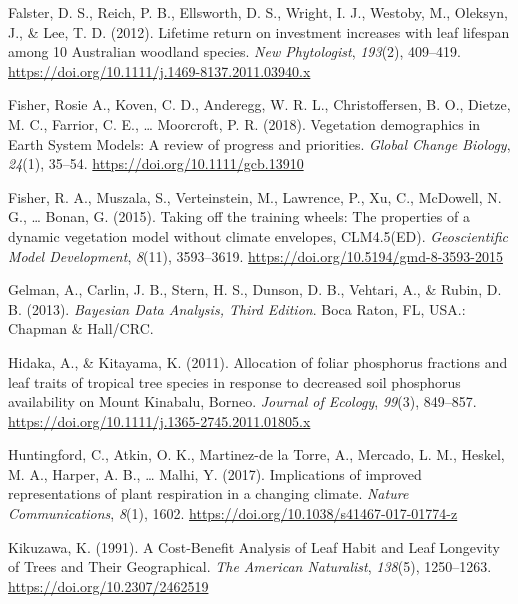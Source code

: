\documentclass[
  12pt,
  letterpaper,
  DIV=11,
  numbers=noendperiod]{scrartcl}
\newlength{\cslhangindent}
\newlength{\cslentryspacingunit} %
\newenvironment{CSLReferences}[2] %
 {%
  \setlength{\parindent}{0pt}
  \ifodd #1
  \let\oldpar\par
  \def\par{\hangindent=\cslhangindent\oldpar}
  \fi
  \setlength{\parskip}{#2\cslentryspacingunit}
 }%
 {}
\begin{document}
\begin{CSLReferences}{1}{0}
\leavevmode{}%
Falster, D. S., Reich, P. B., Ellsworth, D. S., Wright, I. J., Westoby,
M., Oleksyn, J., \& Lee, T. D. (2012). Lifetime return on investment
increases with leaf lifespan among 10 {Australian} woodland species.
\emph{New Phytologist}, \emph{193}(2), 409--419.
\url{https://doi.org/10.1111/j.1469-8137.2011.03940.x}

\leavevmode{}%
Fisher, Rosie A., Koven, C. D., Anderegg, W. R. L., Christoffersen, B.
O., Dietze, M. C., Farrior, C. E., \ldots{} Moorcroft, P. R. (2018).
Vegetation demographics in {Earth System Models}: {A} review of progress
and priorities. \emph{Global Change Biology}, \emph{24}(1), 35--54.
\url{https://doi.org/10.1111/gcb.13910}

\leavevmode{}%
Fisher, R. A., Muszala, S., Verteinstein, M., Lawrence, P., Xu, C.,
McDowell, N. G., \ldots{} Bonan, G. (2015). Taking off the training
wheels: The properties of a dynamic vegetation model without climate
envelopes, {CLM4}.5({ED}). \emph{Geoscientific Model Development},
\emph{8}(11), 3593--3619. \url{https://doi.org/10.5194/gmd-8-3593-2015}

\leavevmode{}%
Gelman, A., Carlin, J. B., Stern, H. S., Dunson, D. B., Vehtari, A., \&
Rubin, D. B. (2013). \emph{Bayesian {Data Analysis}, {Third Edition}}.
{Boca Raton, FL, USA.}: {Chapman \& Hall/CRC}.

\leavevmode{}%
Hidaka, A., \& Kitayama, K. (2011). Allocation of foliar phosphorus
fractions and leaf traits of tropical tree species in response to
decreased soil phosphorus availability on {Mount Kinabalu}, {Borneo}.
\emph{Journal of Ecology}, \emph{99}(3), 849--857.
\url{https://doi.org/10.1111/j.1365-2745.2011.01805.x}

\leavevmode{}%
Huntingford, C., Atkin, O. K., Martinez-de la Torre, A., Mercado, L. M.,
Heskel, M. A., Harper, A. B., \ldots{} Malhi, Y. (2017). Implications of
improved representations of plant respiration in a changing climate.
\emph{Nature Communications}, \emph{8}(1), 1602.
\url{https://doi.org/10.1038/s41467-017-01774-z}

\leavevmode{}%
Kikuzawa, K. (1991). A {Cost-Benefit Analysis} of {Leaf Habit} and {Leaf
Longevity} of {Trees} and {Their Geographical}. \emph{The American
Naturalist}, \emph{138}(5), 1250--1263.
\url{https://doi.org/10.2307/2462519}


\end{CSLReferences}
\end{document}
